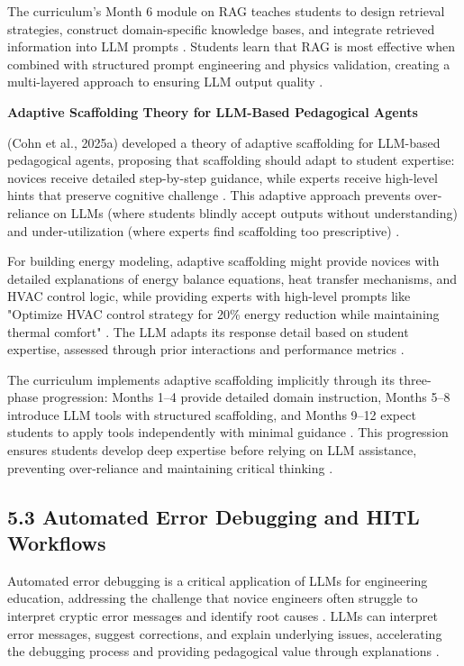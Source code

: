\documentclass[12pt,a4paper]{article}
\begin{document}
The curriculum's Month 6 module on RAG teaches students to design retrieval strategies, construct domain-specific knowledge bases, and integrate retrieved information into LLM prompts \cite{ref291}. Students learn that RAG is most effective when combined with structured prompt engineering and physics validation, creating a multi-layered approach to ensuring LLM output quality \cite{ref292}.

\textbf{Adaptive Scaffolding Theory for LLM-Based Pedagogical Agents}

(Cohn et al., 2025a) developed a theory of adaptive scaffolding for LLM-based pedagogical agents, proposing that scaffolding should adapt to student expertise: novices receive detailed step-by-step guidance, while experts receive high-level hints that preserve cognitive challenge \cite{ref293}. This adaptive approach prevents over-reliance on LLMs (where students blindly accept outputs without understanding) and under-utilization (where experts find scaffolding too prescriptive) \cite{ref294}.

For building energy modeling, adaptive scaffolding might provide novices with detailed explanations of energy balance equations, heat transfer mechanisms, and HVAC control logic, while providing experts with high-level prompts like "Optimize HVAC control strategy for 20\% energy reduction while maintaining thermal comfort" \cite{ref295}. The LLM adapts its response detail based on student expertise, assessed through prior interactions and performance metrics \cite{ref296}.

The curriculum implements adaptive scaffolding implicitly through its three-phase progression: Months 1--4 provide detailed domain instruction, Months 5--8 introduce LLM tools with structured scaffolding, and Months 9--12 expect students to apply tools independently with minimal guidance \cite{ref297}. This progression ensures students develop deep expertise before relying on LLM assistance, preventing over-reliance and maintaining critical thinking \cite{ref298}.

\subsection{5.3 Automated Error Debugging and HITL Workflows}

Automated error debugging is a critical application of LLMs for engineering education, addressing the challenge that novice engineers often struggle to interpret cryptic error messages and identify root causes \cite{ref299}. LLMs can interpret error messages, suggest corrections, and explain underlying issues, accelerating the debugging process and providing pedagogical value through explanations \cite{ref300}.
\end{document}
